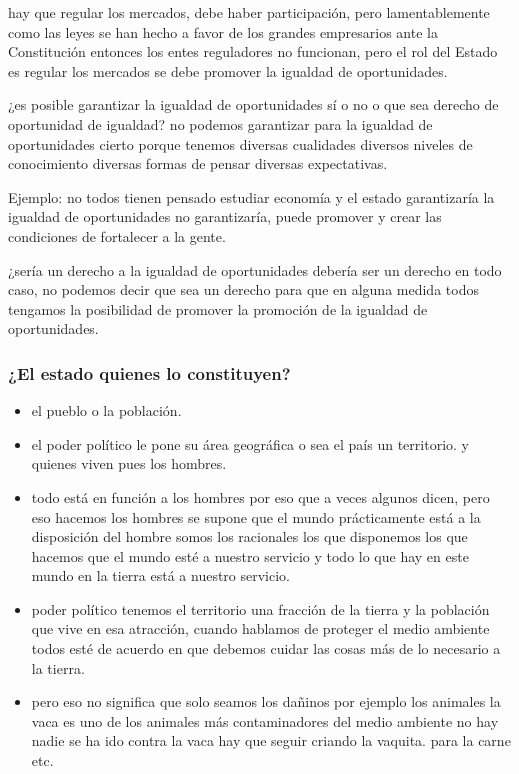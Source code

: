 \documentclass[
  letterpaper,
  DIV=11,
  numbers=noendperiod]{scrartcl}
\providecommand{\tightlist}{%
  \setlength{\itemsep}{0pt}\setlength{\parskip}{0pt}}\usepackage{longtable,booktabs,array}
\begin{document}
hay que regular los mercados, debe haber participación, pero
lamentablemente como las leyes se han hecho a favor de los grandes
empresarios ante la Constitución entonces los entes reguladores no
funcionan, pero el rol del Estado es regular los mercados se debe
promover la igualdad de oportunidades.

¿es posible garantizar la igualdad de oportunidades sí o no o que sea
derecho de oportunidad de igualdad? no podemos garantizar para la
igualdad de oportunidades cierto porque tenemos diversas cualidades
diversos niveles de conocimiento diversas formas de pensar diversas
expectativas.

Ejemplo: no todos tienen pensado estudiar economía y el estado
garantizaría la igualdad de oportunidades no garantizaría, puede
promover y crear las condiciones de fortalecer a la gente.

¿sería un derecho a la igualdad de oportunidades debería ser un derecho
en todo caso, no podemos decir que sea un derecho para que en alguna
medida todos tengamos la posibilidad de promover la promoción de la
igualdad de oportunidades.

\hypertarget{el-estado-quienes-lo-constituyen}{%
\subsubsection{¿El estado quienes lo
constituyen?}\label{el-estado-quienes-lo-constituyen}}

\begin{itemize}
\tightlist
\item
  el pueblo o la población.
\item
  el poder político le pone su área geográfica o sea el país un
  territorio. y quienes viven pues los hombres.
\item
  todo está en función a los hombres por eso que a veces algunos dicen,
  pero eso hacemos los hombres se supone que el mundo prácticamente está
  a la disposición del hombre somos los racionales los que disponemos
  los que hacemos que el mundo esté a nuestro servicio y todo lo que hay
  en este mundo en la tierra está a nuestro servicio.
\item
  poder político tenemos el territorio una fracción de la tierra y la
  población que vive en esa atracción, cuando hablamos de proteger el
  medio ambiente todos esté de acuerdo en que debemos cuidar las cosas
  más de lo necesario a la tierra.
\item
  pero eso no significa que solo seamos los dañinos por ejemplo los
  animales la vaca es uno de los animales más contaminadores del medio
  ambiente no hay nadie se ha ido contra la vaca hay que seguir criando
  la vaquita. para la carne etc.
\end{itemize}
\end{document}
